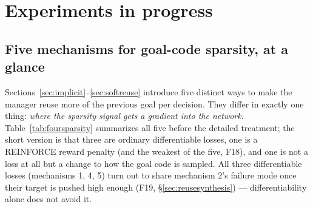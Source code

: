 \documentclass[10pt]{article}
\begin{document}
\section{Experiments in progress}
\label{sec:ongoing}

\subsection{Five mechanisms for goal-code sparsity, at a glance}
\label{sec:foursparsity}

Sections~\ref{sec:implicit}--\ref{sec:softreuse} introduce five distinct
ways to make the manager reuse more of the previous goal per decision. They
differ in exactly one thing: \emph{where the sparsity signal gets a gradient
into the network}. Table~\ref{tab:foursparsity} summarizes all five before
the detailed treatment; the short version is that three are ordinary
differentiable losses, one is a REINFORCE reward penalty (and the weakest of
the five, F18), and one is not a loss at all but a change to how the goal
code is sampled. All three differentiable losses (mechanisms 1, 4, 5) turn
out to share mechanism 2's failure mode once their target is pushed high
enough (F19, \S\ref{sec:reusesynthesis}) --- differentiability alone
does not avoid it.
\end{document}
